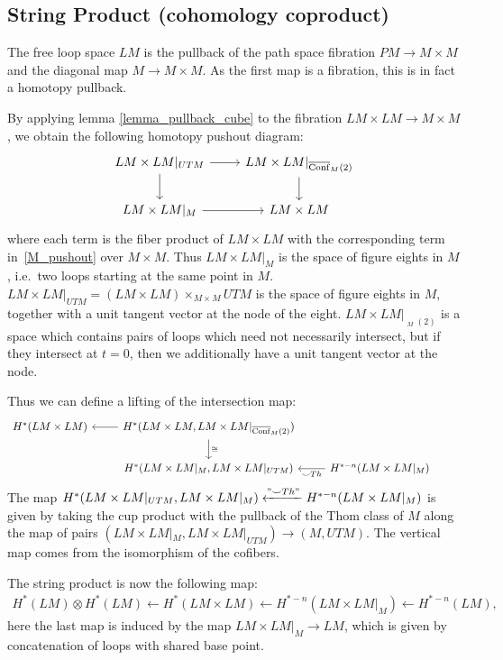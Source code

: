 \documentclass{scrartcl}
\theoremstyle{plain}
\theoremstyle{definition}
\newcommand{\cupp}{\mathbin{\smile}}
\newcommand{\iso}{\cong}
\newcommand{\from}{\leftarrow}
\DeclareMathOperator{\cConf}{\overline{Conf}}
\begin{document}
\subsection{String Product (cohomology coproduct)}
The free loop space $LM$ is the pullback of the path space fibration $PM \to M\times M$ and the diagonal map $M\to M\times M$. As the first map is a fibration, this is in fact a homotopy pullback. %

By applying lemma \ref{lemma_pullback_cube} to the fibration $LM\times LM\to M\times M$, we obtain the following homotopy pushout diagram:
\begin{equation}
    \begin{tikzcd}
        LM\times LM|_{UTM} \rar\dar & LM\times LM |_{\cConf_M(2)} \dar \\
        LM\times LM|_M \rar & LM\times LM
    \end{tikzcd}
\end{equation}
where each term is the fiber product of $LM\times LM$ with the corresponding term in~\ref{M_pushout} over $M\times M$. Thus $LM\times LM|_M$ is the space of figure eights in $M$, i.e.\ two loops starting at the same point in $M$. $LM\times LM|_{UTM} = (LM\times LM)\times_{M\times M} UTM$ is the space of figure eights in $M$, together with a unit tangent vector at the node of the eight. $LM\times LM|_{\cConf_M(2)}$ is a space which contains pairs of loops which need not necessarily intersect, but if they intersect at $t=0$, then we additionally have a unit tangent vector at the node. 

Thus we can define a lifting of the intersection map:
\begin{equation}
    \begin{tikzcd}
        H^{*}(LM \times LM) & \lar H^*(LM\times LM, LM\times LM|_{\cConf_M(2)}) \dar["\iso"] & &\\
        & H^*(LM\times LM|_{M}, LM\times LM|_{UTM}) & \lar["\cupp Th"] H^{*-n}(LM\times LM|_M)
    \end{tikzcd}
\end{equation}
The map $H^*(LM\times LM|_{UTM}, LM\times LM|_M) \xleftarrow{"\cupp Th"} H^{*-n}(LM\times LM|_M)$ is given by taking the cup product with the pullback of the Thom class of $M$ along the map of pairs $(LM\times LM|_{M}, LM\times LM|_{UTM}) \to (M, UTM)$. The vertical map comes from the isomorphism of the cofibers. 

The string product is now the following map: 
\begin{align*}
    H^*(LM)\otimes H^*(LM) \from H^*(LM\times LM) \from H^{*-n}(LM\times LM|_M) \from H^{*-n}(LM),
\end{align*}
here the last map is induced by the map $LM\times LM|_M \to LM$, which is given by concatenation of loops with shared base point.
\end{document}

